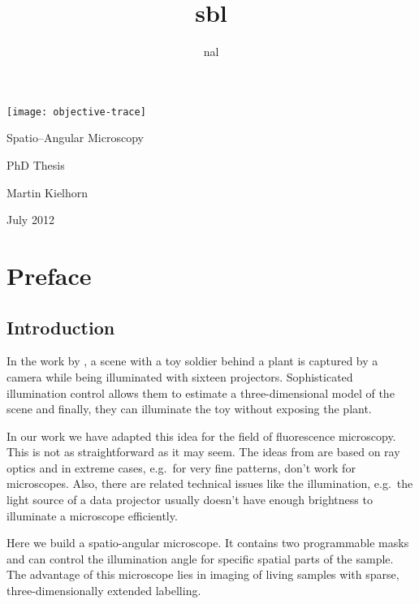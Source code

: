 \documentclass[oneside,a4paper,12pt,BCOR20mm,DIV14]{scrbook}
\title{sbl}
\author{nal}
\begin{document}
\listoftodos
\begin{titlepage}
  
  \hspace{-4cm}
  \texttt{[image: objective-trace]}



  \vspace{-5cm}
  
  \hspace{4cm}\textsf{\Huge Spatio--Angular Microscopy}
  
  \vspace{2cm}
  \hspace{6cm}\textsf{\huge PhD Thesis}


  \vspace{3cm}
  \hspace{4cm}\textsf{\Large Martin Kielhorn}
  
  \vspace{1cm}
  \hspace{4cm}\textsf{\Large July 2012}
\end{titlepage}
\newpage

\section*{Preface}
\subsection*{Introduction}
In the work by \citet{Levoy2003}, a scene with a toy soldier behind a
plant is captured by a camera while being illuminated with sixteen
projectors.  Sophisticated illumination control allows them to
estimate a three-dimensional model of the scene and finally, they can
illuminate the toy without exposing the plant.

In our work we have adapted this idea for the field of fluorescence
microscopy. This is not as straightforward as it may seem.  The ideas
from \citet{Levoy2003} are based on ray optics and in extreme cases,
e.g.\ for very fine patterns, don't work for microscopes. Also, there
are related technical issues like the illumination, e.g.\ the light
source of a data projector usually doesn't have enough brightness to
illuminate a microscope efficiently.

Here we build a spatio-angular microscope. It contains two
programmable masks and can control the illumination angle for specific
spatial parts of the sample. The advantage of this microscope lies in
imaging of living samples with sparse, three-dimensionally extended
labelling.
\end{document}

